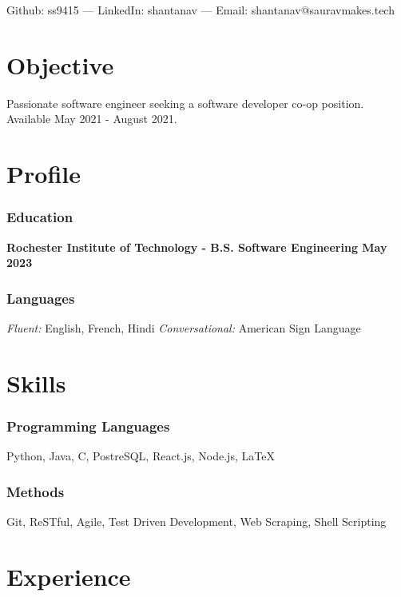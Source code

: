 \documentclass[11pt, letterpaper]{article}
\makeatletter
\renewcommand{\maketitle} {
    \begin{center}    
        {\LARGE\bfseries \theauthor}

        \vspace{.5em}

        Github: ss9415 --- LinkedIn: shantanav --- Email: shantanav@sauravmakes.tech
    \end{center}
    \thispagestyle{empty}
}
\makeatother
\begin{document}
    \author{Shantanav Saurav}
    \maketitle

    \section{Objective}
        Passionate software engineer seeking a software developer co-op position. 
        Available May 2021 - August 2021.

    \section{Profile}
        \subsubsection{Education}
            \textbf{Rochester Institute of Technology - B.S. Software Engineering \hfill May 2023}
        \subsubsection{Languages}
            \emph{Fluent:} English, French, Hindi 
            \emph{Conversational:} American Sign Language

    \section{Skills}
        \subsubsection{Programming Languages}
            Python, Java, C, PostreSQL, React.js, Node.js, \LaTeX
        \subsubsection{Methods}
            Git, ReSTful, Agile, Test Driven Development, Web Scraping, Shell Scripting

    \section{Experience}
\end{document}
